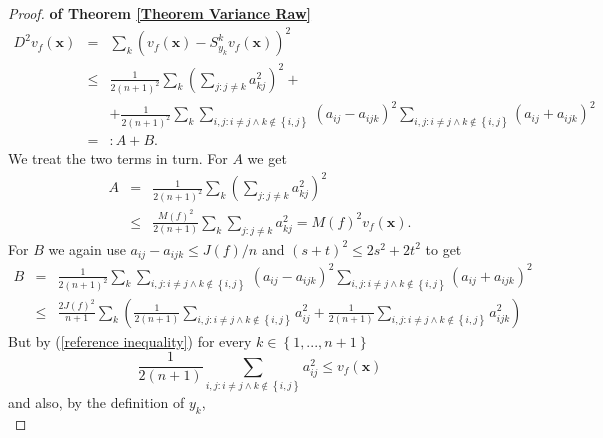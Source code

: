 \documentclass[final,12pt]{colt2018} %
\begin{document}
\begin{proof}{\bf of Theorem \protect\ref{Theorem Variance Raw}}
							\begin{eqnarray*}
								D^{2}v_{f}\left( \mathbf{x}\right) &=&\sum_{k}\left( v_{f}\left( \mathbf{x}%
								\right) -S_{y_{k}}^{k}v_{f}\left( \mathbf{x}\right) \right) ^{2} \\
								&\leq &\frac{1}{2\left( n+1\right) ^{2}}\sum_{k}\left( \sum_{j:j\neq
									k}a_{kj}^{2}\right) ^{2}+ \\
								&&+\frac{1}{2\left( n+1\right) ^{2}}\sum_{k}\sum_{i,j:i\neq j\wedge k\notin
									\left\{ i,j\right\} \ }\left( a_{ij}-a_{ijk}\right) ^{2}\sum_{i,j:i\neq
									j\wedge k\notin \left\{ i,j\right\} }\left( a_{ij}+a_{ijk}\right) ^{2} \\
								&=&:A+B.
							\end{eqnarray*}%
							We treat the two terms in turn. For $A$ we get%
							\begin{eqnarray*}
								A &=&\frac{1}{2\left( n+1\right) ^{2}}\sum_{k}\left( \sum_{j:j\neq
									k}a_{kj}^{2}\right) ^{2} \\
								&\leq &\frac{M\left( f\right) ^{2}}{2\left( n+1\right) }\sum_{k}\sum_{j:j%
									\neq k}a_{kj}^{2}=M\left( f\right) ^{2}v_{f}\left( \mathbf{x}\right) .
							\end{eqnarray*}%
							For $B$ we again use $a_{ij}-a_{ijk}\leq J\left( f\right) /n$ and $\left(
							s+t\right) ^{2}\leq 2s^{2}+2t^{2}$ to get%
							\begin{eqnarray*}
								B &=&\frac{1}{2\left( n+1\right) ^{2}}\sum_{k}\sum_{i,j:i\neq j\wedge
									k\notin \left\{ i,j\right\} \ }\left( a_{ij}-a_{ijk}\right)
								^{2}\sum_{i,j:i\neq j\wedge k\notin \left\{ i,j\right\} }\left(
								a_{ij}+a_{ijk}\right) ^{2} \\
								&\leq &\frac{2J\left( f\right) ^{2}}{n+1}\sum_{k}\left( \frac{1}{2\left(
									n+1\right) }\sum_{i,j:i\neq j\wedge k\notin \left\{ i,j\right\} }a_{ij}^{2}+%
								\frac{1}{2\left( n+1\right) }\sum_{i,j:i\neq j\wedge k\notin \left\{
									i,j\right\} }a_{ijk}^{2}\right)
							\end{eqnarray*}%
							But by (\ref{reference inequality}) for every $k\in \left\{
							1,...,n+1\right\} $%
							\begin{equation*}
							\frac{1}{2\left( n+1\right) }\sum_{i,j:i\neq j\wedge k\notin \left\{
								i,j\right\} }a_{ij}^{2}\leq v_{f}\left( \mathbf{x}\right) 
							\end{equation*}%
							and also, by the definition of $y_{k}$, 
							\begin{equation*}

\end{equation*}
\end{proof}
\end{document}
